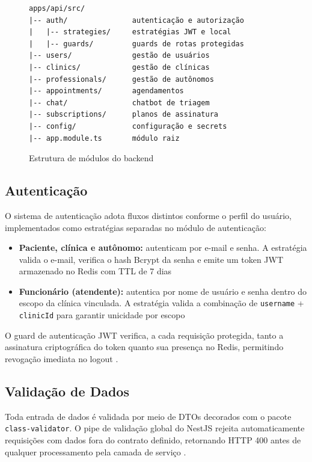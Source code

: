 \begin{figure}[H]
  \centering
  \caption{Estrutura de módulos do backend}
  \label{fig:backend-modules}
\begin{verbatim}
apps/api/src/
|-- auth/               autenticação e autorização
|   |-- strategies/     estratégias JWT e local
|   |-- guards/         guards de rotas protegidas
|-- users/              gestão de usuários
|-- clinics/            gestão de clínicas
|-- professionals/      gestão de autônomos
|-- appointments/       agendamentos
|-- chat/               chatbot de triagem
|-- subscriptions/      planos de assinatura
|-- config/             configuração e secrets
|-- app.module.ts       módulo raiz
\end{verbatim}
\end{figure}

\subsection{Autenticação}
\label{subsec:auth}

O sistema de autenticação adota fluxos distintos
conforme o perfil do usuário, implementados como
estratégias separadas no módulo de autenticação:

\begin{itemize}
  \item \textbf{Paciente, clínica e autônomo:}
        autenticam por e-mail e senha. A estratégia
        valida o e-mail, verifica o hash Bcrypt da
        senha e emite um token JWT armazenado no
        Redis com TTL de 7 dias
  \item \textbf{Funcionário (atendente):}
        autentica por nome de usuário e senha dentro
        do escopo da clínica vinculada. A estratégia
        valida a combinação de \texttt{username} +
        \texttt{clinicId} para garantir unicidade
        por escopo
\end{itemize}

O guard de autenticação JWT verifica,
a cada requisição protegida, tanto a assinatura
criptográfica do token quanto sua presença no Redis,
permitindo revogação imediata no logout
\cite{rfc7519}.

\subsection{Validação de Dados}
\label{subsec:backend-validation}

Toda entrada de dados é validada por meio de DTOs
decorados com o pacote \texttt{class-validator}.
O pipe de validação global do NestJS rejeita
automaticamente requisições com dados fora do
contrato definido, retornando HTTP 400 antes de
qualquer processamento pela camada de serviço
\cite{nestjs2024}.


